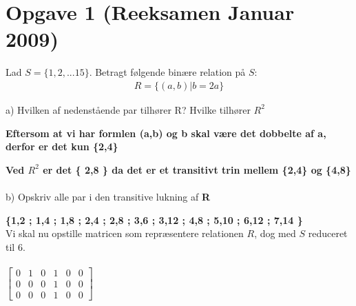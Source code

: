 \documentclass{article}
\begin{document}
\section{Opgave 1 (Reeksamen Januar 2009)}
Lad $S = \{1,2,... 15 \}$. Betragt følgende binære relation på $S$:
\\
\begin{align*}
 R = \{(a,b) | b = 2a\} 
\end{align*}

a) Hvilken af nedenstående par tilhører R? Hvilke tilhører $R^2$

\textbf{Eftersom at vi har formlen (a,b) og b skal være det dobbelte af a, derfor er det kun \{2,4\}}

\textbf{Ved $R^2$ er det \{ 2,8 \} da det er et transitivt trin mellem \{2,4\} og \{4,8\} }
\\
\\
b) Opskriv alle par i den transitive lukning af \textbf{R}

\textbf{\{1,2 ; 1,4 ; 1,8 ; 2,4 ; 2,8 ;  3,6 ; 3,12 ; 4,8 ; 5,10 ; 6,12 ; 7,14 \}}
\\

Vi skal nu opstille matricen som repræsentere relationen $R$, dog med $S$ reduceret til 6.
\\
\\
\begin{math}
\begin{bmatrix}
0 & 1 & 0 & 1 & 0 & 0\\
0 & 0 & 0 & 1 & 0 & 0\\
0 & 0 & 0 & 1 & 0 & 0
\end{bmatrix}
\end{math}
\end{document}
